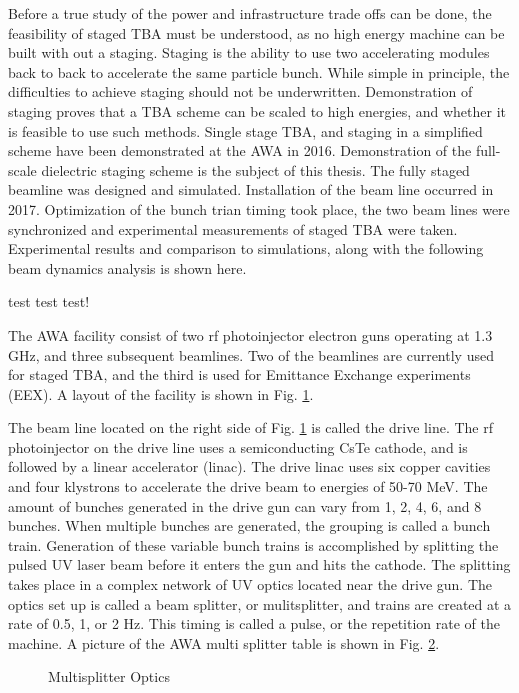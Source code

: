 \documentclass{iitthesis}
\newcommand{\lsnote}[1]{\textsf{{\color{violet}{ LS note:}   #1 }}}
\begin{document}
Before a true study of the power and infrastructure trade offs 
can be done, the feasibility of staged TBA must be understood, 
as no high energy machine can be built with out a staging.
Staging is the ability to use two accelerating modules back to back to accelerate 
the same particle bunch. While simple in principle, the difficulties 
to achieve staging should not be underwritten. Demonstration of staging proves 
that a TBA scheme can be scaled to high energies, and whether it is 
feasible to use such methods. Single stage TBA, and staging 
in a simplified scheme have been demonstrated at the AWA in 2016. 
Demonstration of the full-scale dielectric staging scheme is the 
subject of this thesis. The fully staged beamline was designed and 
simulated. Installation of the beam line occurred in 2017.
Optimization of the bunch trian timing took place, the two 
beam lines were synchronized and experimental measurements 
of staged TBA were taken. 
Experimental results and comparison to simulations, along 
with the following beam dynamics analysis is shown here.

\lsnote{test test test!}



The AWA facility consist of two rf photoinjector electron guns operating
at 1.3 GHz, and three subsequent beamlines. %
Two of the beamlines are currently used for staged TBA, and the
third is used for Emittance Exchange experiments (EEX). A layout of
the facility is shown in Fig. \ref{fig:bunker}. 

The beam line located on the right side of Fig. \ref{fig:bunker} is called the
drive line. The rf photoinjector on the drive line uses a semiconducting
CsTe cathode, and is followed by a linear accelerator (linac). The
drive linac uses six copper cavities and four klystrons to accelerate the drive beam
to energies of 50-70 MeV. The amount of bunches generated in the drive
gun can vary from 1, 2, 4, 6, and 8 bunches. When multiple bunches
are generated, the grouping is called a bunch train. Generation of
these variable bunch trains is accomplished by splitting the pulsed
UV laser beam before it enters the gun and hits the cathode. The splitting
takes place in a complex network of UV optics located near the drive
gun. The optics set up is called a beam splitter, or mulitsplitter,
and trains are created at a rate of 0.5, 1, or 2 Hz. This timing is
called a pulse, or the repetition rate of the machine. A picture of
the AWA multi splitter table is shown in Fig. \ref{fig:optics}. 
\begin{figure}
	\begin{center}
		\label{fig:bunker}
	\end{center}
\end{figure}
\begin{figure}
	\begin{center}
		\caption{Multisplitter Optics}
		\label{fig:optics}
	\end{center}
\end{figure}
\end{document}
